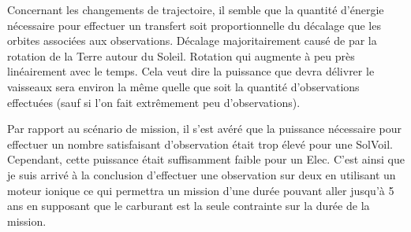 \documentclass[11pt]{article} %
\begin{document}
		Concernant les changements de trajectoire, il semble que la quantité d'énergie nécessaire pour effectuer un transfert soit proportionnelle du décalage que les orbites associées aux observations. Décalage majoritairement causé de par la rotation de la Terre autour du Soleil. Rotation qui augmente à peu près linéairement avec le temps. Cela veut dire la puissance que devra délivrer le vaisseaux sera environ la même quelle que soit la quantité d'observations effectuées (sauf si l'on fait extrêmement peu d'observations).
		
		Par rapport au scénario de mission, il s'est avéré que la puissance nécessaire pour effectuer un nombre satisfaisant d'observation était trop élevé pour une \gls{SolVoil}. Cependant, cette puissance était suffisamment faible pour un \gls{Elec}. C'est ainsi que je suis arrivé à la conclusion d'effectuer une observation sur deux en utilisant un moteur ionique ce qui permettra un mission d'une durée pouvant aller jusqu'à 5 ans en supposant que le carburant est la seule contrainte sur la durée de la mission.
		
		
		
\end{document}

